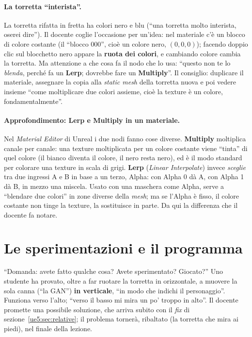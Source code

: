 \paragraph{La torretta ``interista''.} La torretta rifatta in fretta ha colori nero e
blu (``una torretta molto interista, oserei dire''). Il docente coglie l'occasione per
un'idea: nel materiale c'è un blocco di colore costante (il ``blocco 000'', cioè un
colore nero, $(0,0,0)$); facendo doppio clic sul blocchetto nero appare la
\textbf{ruota dei colori}, e cambiando colore cambia la torretta. Ma attenzione a che
cosa fa il nodo che lo usa: ``questo non te lo \emph{blenda}, perché fa un
\textbf{Lerp}; dovrebbe fare un \textbf{Multiply}''. Il consiglio: duplicare il
materiale, assegnare la copia alla \emph{static mesh} della torretta nuova e poi vedere
insieme ``come moltiplicare due colori assieme, cioè la texture è un colore,
fondamentalmente''.

\paragraph{Approfondimento: Lerp e Multiply in un materiale.} Nel \emph{Material Editor}
di Unreal i due nodi fanno cose diverse. \textbf{Multiply} moltiplica canale per canale:
una texture moltiplicata per un colore costante viene ``tinta'' di quel colore (il
bianco diventa il colore, il nero resta nero), ed è il modo standard per colorare una
texture in scala di grigi. \textbf{Lerp} (\emph{Linear Interpolate}) invece
\emph{sceglie} tra due ingressi A e B in base a un terzo, Alpha: con Alpha 0 dà A, con
Alpha 1 dà B, in mezzo una miscela. Usato con una maschera come Alpha, serve a
``blendare due colori'' in zone diverse della \emph{mesh}; ma se l'Alpha è fisso, il
colore costante non tinge la texture, la sostituisce in parte. Da qui la differenza che
il docente fa notare.

\section{Le sperimentazioni e il programma}
\label{ue5:sec:programma}

``Domanda: avete fatto qualche cosa? Avete sperimentato? Giocato?'' Uno studente ha
provato, oltre a far ruotare la torretta in orizzontale, a muovere la sola canna
(``la GAN'') \textbf{in verticale}, ``in modo che indichi il personaggio''. Funziona
verso l'alto; ``verso il basso mi mira un po' troppo in alto''. Il docente promette una
possibile soluzione, che arriva subito con il \emph{fix} di
sezione~\ref{ue5:sec:relative}; il problema tornerà, ribaltato (la torretta che mira ai
piedi), nel finale della lezione.

